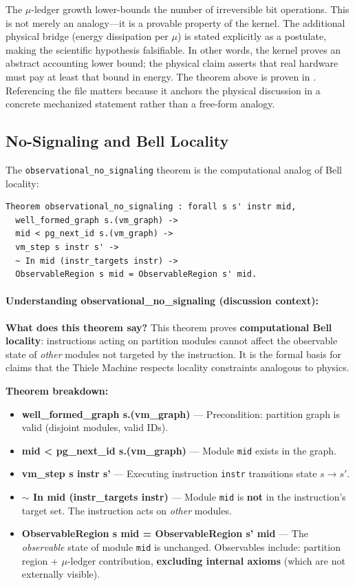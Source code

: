 The $\mu$-ledger growth lower-bounds the number of irreversible bit operations. This is not merely an analogy—it is a provable property of the kernel. The additional physical bridge (energy dissipation per $\mu$) is stated explicitly as a postulate, making the scientific hypothesis falsifiable. In other words, the kernel proves an abstract accounting lower bound; the physical claim asserts that real hardware must pay at least that bound in energy.
The theorem above is proven in . Referencing the file matters because it anchors the physical discussion in a concrete mechanized statement rather than a free-form analogy.

\subsection{No-Signaling and Bell Locality}

The \texttt{observational\_no\_signaling} theorem is the computational analog of Bell locality:
\begin{lstlisting}
Theorem observational_no_signaling : forall s s' instr mid,
  well_formed_graph s.(vm_graph) ->
  mid < pg_next_id s.(vm_graph) ->
  vm_step s instr s' ->
  ~ In mid (instr_targets instr) ->
  ObservableRegion s mid = ObservableRegion s' mid.
\end{lstlisting}

\paragraph{Understanding observational\_no\_signaling (discussion context):}

\textbf{What does this theorem say?} This theorem proves \textbf{computational Bell locality}: instructions acting on partition modules cannot affect the observable state of \textit{other} modules not targeted by the instruction. It is the formal basis for claims that the Thiele Machine respects locality constraints analogous to physics.

\textbf{Theorem breakdown:}
\begin{itemize}
    \item \textbf{well\_formed\_graph s.(vm\_graph)} — Precondition: partition graph is valid (disjoint modules, valid IDs).
    \item \textbf{mid < pg\_next\_id s.(vm\_graph)} — Module \texttt{mid} exists in the graph.
    \item \textbf{vm\_step s instr s'} — Executing instruction \texttt{instr} transitions state $s \to s'$.
    \item \textbf{$\sim$ In mid (instr\_targets instr)} — Module \texttt{mid} is \textbf{not} in the instruction's target set. The instruction acts on \textit{other} modules.
    \item \textbf{ObservableRegion s mid = ObservableRegion s' mid} — The \textit{observable} state of module \texttt{mid} is unchanged. Observables include: partition region + $\mu$-ledger contribution, \textbf{excluding internal axioms} (which are not externally visible).
\end{itemize}

